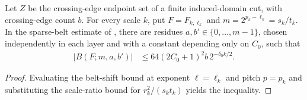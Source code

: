 \begin{lemma}
    \label{thm:area_law_sparse_dyadic_belts}
    \leanok
    Let $Z$ be the crossing-edge endpoint set of a finite induced-domain
    cut, with crossing-edge count $b$. For every scale $k$, put
    $F=F_{k,\ell_k}$ and $m=2^{p_k-\ell_k}=s_k/t_k$. In the sparse-belt
    estimate of \cite[Section~11]{OpenAI2026AreaLaw}, there are residues
    $a,b'\in\{0,\ldots,m-1\}$, chosen independently in each layer and with a
    constant depending only on $C_0$, such that
    \begin{align}
        |B(F;m,a,b')| & \le64(2C_0+1)^2b\,2^{-\delta_0 k/2}.
    \end{align}
\end{lemma}
\begin{proof}\leanok
    Evaluating the belt-shift bound at exponent $\ell=\ell_k$ and pitch
    $p=p_k$ and substituting the scale-ratio bound for $r_k^2/(s_k t_k)$
    yields the inequality.
\end{proof}
